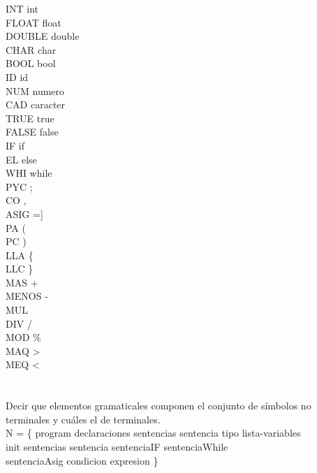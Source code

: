 \documentclass[a4paper,10pt]{article}
\begin{document}
\noindent
    INT \rightarrow int\\
    FLOAT \rightarrow float\\
    DOUBLE \rightarrow double\\
    CHAR \rightarrow char\\
    BOOL \rightarrow bool\\
    ID \rightarrow id\\
    NUM \rightarrow numero\\
    CAD \rightarrow caracter\\
    TRUE \rightarrow true\\
    FALSE \rightarrow false\\
    IF \rightarrow if\\
    EL \rightarrow else\\
    WHI \rightarrow while\\
    PYC \rightarrow ;\\
    CO \rightarrow ,\\
    ASIG \rightarrow =]\\
    PA \rightarrow (\\
    PC \rightarrow )\\
    LLA \rightarrow \{\\
    LLC \rightarrow \}\\
    MAS \rightarrow +\\
    MENOS \rightarrow - \\
    MUL \rightarrow *\\
    DIV \rightarrow /\\
    MOD \rightarrow \%\\
    MAQ \rightarrow >\\
    MEQ \rightarrow <\\

\section{}


\section{}
Decir que elementos gramaticales componen el conjunto de símbolos no  terminales
y cuáles el de terminales.\\

\noindent
N = \{ program declaraciones sentencias sentencia tipo lista-variables\\
\-\hspace{1cm}init sentencias sentencia sentenciaIF sentenciaWhile\\
\-\hspace{1cm}sentenciaAsig condicion expresion \}\\
\end{document}
